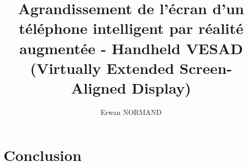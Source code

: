 \documentclass[letterpaper, twoside, 12pt,%
  memoire,  french, creativecommons, hyperref, withAlgo2e%
]{thETS}
\title{Agrandissement de l'écran d'un téléphone intelligent par réalité augmentée - Handheld VESAD (Virtually Extended Screen-Aligned Display)}
\author{Erwan NORMAND}
\begin{document}
\maketitle
\presentjury

\begin{avantpropos}
  
\end{avantpropos}

\begin{remerciements}
  
\end{remerciements}



\tableofcontents
\listoftables
\listoffigures

\begin{listofabbr}[3cm]
  
\end{listofabbr}

\cleardoublepage

\reversemarginpar
\setcounter{footnote}{0}

\begin{introduction}
  
\end{introduction}







\chapter*{Conclusion}
\label{ch:conclusion}


\appendix
\multiannexe



\newpage
\begin{spacing}{1}
  \nocite{*}
  
  
\end{spacing}
\end{document}
